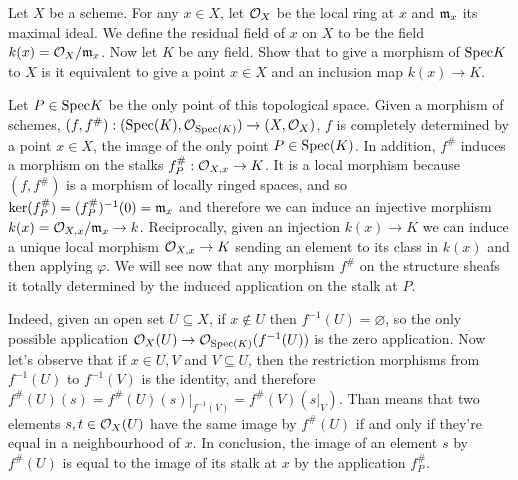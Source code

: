 \begin{ex}
	Let $X$ be a scheme. For any $x \in X$, let $\mathcal{O}_X$ be the local ring at $x$ and $\mathfrak{m}_x$ its maximal ideal. We define the residual field of $x$ on $X$ to be the field $k(x) = \mathcal{O}_X/\mathfrak{m}_x$. Now let $K$ be any field. Show that to give a morphism of $\mathrm{Spec} K$ to $X$ is it equivalent to give a point $x \in X$ and an inclusion map $k(x) \to K$.
\end{ex}

\begin{sol}
	Let $P \in \mathrm{Spec} K$ be the only point of this topological space. Given a morphism of schemes, $(f,f^{\#}): (\mathrm{Spec} (K), \mathcal{O}_{\mathrm{Spec}(K)}) \to (X, \mathcal{O}_X)$, $f$ is completely determined by a point $x \in X$, the image of the only point $P \in \mathrm{Spec}(K)$. In addition, $f^{\#}$ induces a morphism on the stalks $f^{\#}_P: \mathcal{O}_{X,x} \to K$. It is a local morphism because $(f,f^{\#})$ is a morphism of locally ringed spaces, and so $\ker(f^{\#}_P) = (f^{\#}_P)^{-1}(0) = \mathfrak{m}_x$ and therefore we can induce an injective morphism $k(x) = \mathcal{O}_{X,x}/\mathfrak{m}_x \to k$. Reciprocally, given an injection $k(x) \to K$ we can induce a unique local morphism $\mathcal{O}_{X,x} \to K$ sending an element to its class in $k(x)$ and then applying $\varphi$. We will see now that any morphism $f^{\#}$ on the structure sheafs it totally determined by the induced application on the stalk at $P$. 


	Indeed, given an open set $U \subseteq X$, if $x \notin U$ then $f^{-1}(U) = \varnothing$, so the only possible application $\mathcal{O}_X(U) \to \mathcal{O}_{\mathrm{Spec}(K)}(f^{-1}(U))$ is the zero application. Now let's observe that if $x \in U,V$ and $V \subseteq U$, then the restriction morphisms from $f^{-1}(U)$ to $f^{-1}(V)$ is the identity, and therefore $f^{\#}(U)(s) = f^{\#}(U)(s)|_{f^{-1}(V)} = f^{\#}(V)(s|_V)$. Than means that two elements $s,t \in \mathcal{O}_X(U)$ have the same image by $f^{\#}(U)$ if and only if they're equal in a neighbourhood of $x$. In conclusion, the image of an element $s$ by $f^{\#}(U)$ is equal to the image of its stalk at $x$ by the application $f^{\#}_P$. 


\end{sol}
